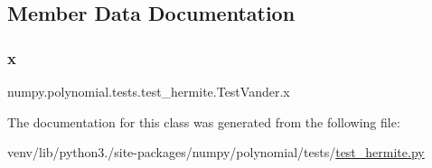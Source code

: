 \subsection{Member Data Documentation}
\mbox{\label{classnumpy_1_1polynomial_1_1tests_1_1test__hermite_1_1TestVander_a8e5f96f624f1a6057a2241ce94c8aee5}} 
\subsubsection{\texorpdfstring{x}{x}}
{\footnotesize\ttfamily numpy.\+polynomial.\+tests.\+test\+\_\+hermite.\+Test\+Vander.\+x\hspace{0.3cm}{\ttfamily [static]}}



The documentation for this class was generated from the following file\+:\begin{DoxyCompactItemize}
\item 
venv/lib/python3./site-\/packages/numpy/polynomial/tests/\hyperlink{test__hermite_8py}{test\+\_\+hermite.\+py}\end{DoxyCompactItemize}

